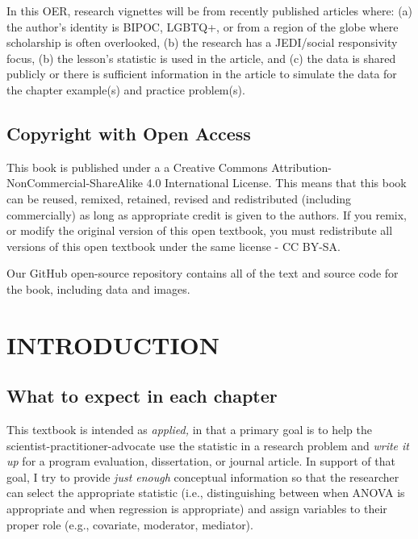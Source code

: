 \documentclass[
  english,
]{book}
\begin{document}
In this OER, research vignettes will be from recently published articles where: (a) the author's identity is BIPOC, LGBTQ+, or from a region of the globe where scholarship is often overlooked, (b) the research has a JEDI/social responsivity focus, (b) the lesson's statistic is used in the article, and (c) the data is shared publicly or there is sufficient information in the article to simulate the data for the chapter example(s) and practice problem(s).

\hypertarget{copyright-with-open-access}{%
\section*{Copyright with Open Access}\label{copyright-with-open-access}}

This book is published under a a Creative Commons Attribution-NonCommercial-ShareAlike 4.0 International License. This means that this book can be reused, remixed, retained, revised and redistributed (including commercially) as long as appropriate credit is given to the authors. If you remix, or modify the original version of this open textbook, you must redistribute all versions of this open textbook under the same license - CC BY-SA.

Our GitHub open-source repository contains all of the text and source code for the book, including data and images.

\hypertarget{ReCintro}{%
\chapter{INTRODUCTION}\label{ReCintro}}

\hypertarget{what-to-expect-in-each-chapter}{%
\section{What to expect in each chapter}\label{what-to-expect-in-each-chapter}}

This textbook is intended as \emph{applied,} in that a primary goal is to help the scientist-practitioner-advocate use the statistic in a research problem and \emph{write it up} for a program evaluation, dissertation, or journal article. In support of that goal, I try to provide \emph{just enough} conceptual information so that the researcher can select the appropriate statistic (i.e., distinguishing between when ANOVA is appropriate and when regression is appropriate) and assign variables to their proper role (e.g., covariate, moderator, mediator).
\end{document}
